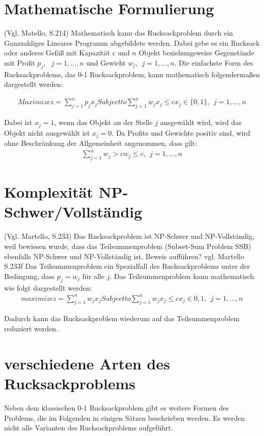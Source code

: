 \section{Mathematische Formulierung}
(Vgl. Matello, S.214)
Mathematisch kann das Rucksackproblem durch ein Ganzzahliges Lineares Programm abgebildete werden. Dabei gebe es ein Rucksack oder anderes Gefäß mit Kapazität $c$ und $n$ Objekt beziehungsweise Gegenstände mit
	Profit $p_j,\ \ \ j=1,\ldots,n$ und
	Gewicht $w_j,\ \ j=1,\ldots,n$.
Die einfachste Form des Rucksackproblems, das 0-1 Rucksackproblem, kann mathematisch folgendermaßen dargestellt werden:

\begin{eqnarray}
    Maximize
    z=\sum_{j=1}^{n}{p_jx_j}
    Subject to 
    \sum_{j=1}^{n}{w_jx_j\le c}
    x_j\in\{0,1\},\ \ j=1,\ldots,n
\end{eqnarray}

Dabei ist $x_j = 1$, wenn das Objekt an der Stelle $j$ ausgewählt wird, wird das Objekt nicht ausgewählt ist $x_j = 0$. Da Profite und Gewichte positiv sind, wird ohne Beschränkung der Allgemeinheit angenommen, dass gilt:
\begin{eqnarray}
    \sum_{j=1}^{n}{w_j>c}
    w_j\le c,\ \ j=1,\ldots,n
\end{eqnarray}


\section{Komplexität NP-Schwer/Vollständig}
(Vgl. Martello, S.233)
Das Rucksackproblem ist NP-Schwer und NP-Vollständig, weil bewiesen wurde, dass das Teilsummenproblem (Subset-Sum Problem SSB) ebenfalls NP-Schwer und NP-Vollständig ist. Beweis aufführen? vgl. Martello S.233f Das Teilsummenproblem ein Spezialfall des Rucksackproblems unter der Bedingung, dass $p_j=w_j$ für alle $j$. Das Teilsummenproblem kann mathematisch wie folgt dargestellt werden:
\begin{eqnarray}
maximize
z=\sum_{j=1}^{n}{w_jx_j}
Subject to 
\sum_{j=1}^{n}{w_jx_j\le c}
x_j\in0,1,\ \ j=1,\ldots,n
\end{eqnarray}

Dadurch kann das Rucksackproblem wiederum auf das Teilsummenproblem reduziert werden. 

\section{verschiedene Arten des Rucksackproblems}
Neben dem klassischen 0-1 Rucksackproblem gibt es weitere Formen des Problems, die im Folgenden in einigen Sätzen beschrieben werden. Es werden nicht alle Varianten des Rucksackproblems aufgeführt. 
